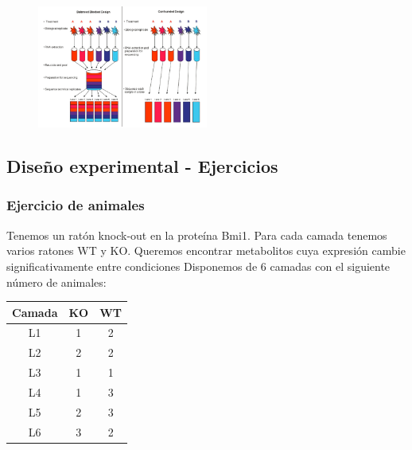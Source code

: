 \begin{figure}[h]
\centering
\includegraphics[width = 0.5\textwidth]{figs/blocking.png}
\end{figure}

\subsection{Diseño experimental - Ejercicios}
\subsubsection{Ejercicio de animales}
Tenemos un ratón knock-out en la proteína Bmi1. Para cada camada tenemos varios ratones WT y KO. Queremos encontrar metabolitos cuya expresión cambie significativamente entre condiciones
Disponemos de 6 camadas con el siguiente número de animales:
\begin{table}[h]
\centering
\begin{tabular}{c | c c}
Camada & KO & WT \\ \hline
L1 & 1 & 2 \\
L2 & 2 & 2 \\
L3 & 1 & 1 \\
L4 & 1 & 3 \\
L5 & 2 & 3 \\
L6 & 3 & 2 
\end{tabular}
\end{table}

